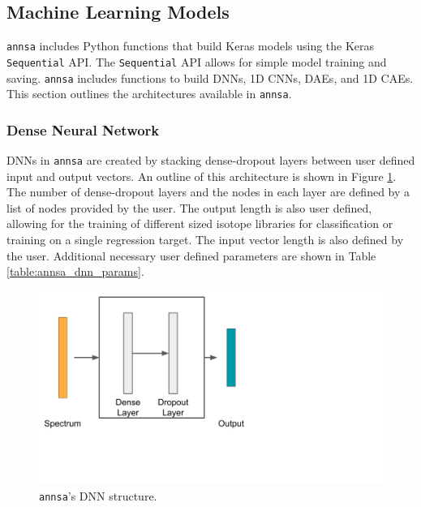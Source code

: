 \subsection{Machine Learning Models}

\verb|annsa| includes Python functions that build Keras models using the Keras \verb|Sequential| API. The \verb|Sequential| API allows for simple model training and saving. \verb|annsa| includes functions to build DNNs, 1D CNNs, DAEs, and 1D CAEs. This section outlines the architectures available in \verb|annsa|.


\subsubsection{Dense Neural Network}

DNNs in \verb|annsa| are created by stacking dense-dropout layers between user defined input and output vectors. An outline of this architecture is shown in Figure \ref{fig:annsa_dnn}. The number of dense-dropout layers and the nodes in each layer are defined by a list of nodes provided by the user. The output length is also user defined, allowing for the training of different sized isotope libraries for classification or training on a single regression target. The input vector length is also defined by the user. Additional necessary user defined parameters are shown in Table \ref{table:annsa_dnn_params}.

\begin{figure}[H]
\centering
\includegraphics[trim=0 110 380 0,clip,width=0.6\linewidth]{images/annsa_dnn.png}
\caption{\texttt{annsa}'s DNN structure.}
\label{fig:annsa_dnn}
\end{figure}

